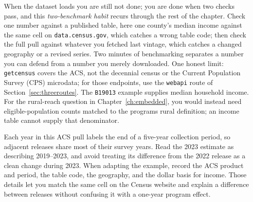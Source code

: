 \documentclass[
    a4paper,
    fontsize=10pt,
    twoside=true,
    numbers=noenddot,
]{kaobook}
\begin{document}
When the dataset loads you are still not done; you are done when two checks pass, and this \emph{two-benchmark habit} recurs through the rest of the chapter. Check one number against a published table, here one county's median income against the same cell on \texttt{data.census.gov}, which catches a wrong table code; then check the full pull against whatever you fetched last vintage, which catches a changed geography or a revised series. Two minutes of benchmarking separates a number you can defend from a number you merely downloaded. One honest limit: \texttt{getcensus} covers the ACS, not the decennial census or the Current Population Survey (CPS) microdata; for those endpoints, use the \texttt{webapi} route of Section~\ref{sec:threeroutes}. The \texttt{B19013} example supplies median household income. For the rural-reach question in Chapter~\ref{ch:embedded}, you would instead need eligible-population counts matched to the program\textquotesingle s rural definition; an income table cannot supply that denominator.

Each year in this ACS pull labels the end of a five-year collection period, so adjacent releases share most of their survey years. Read the 2023 estimate as describing 2019--2023, and avoid treating its difference from the 2022 release as a clean change during 2023. When adapting the example, record the ACS product and period, the table code, the geography, and the dollar basis for income. Those details let you match the same cell on the Census website and explain a difference between releases without confusing it with a one-year program effect.
\end{document}
